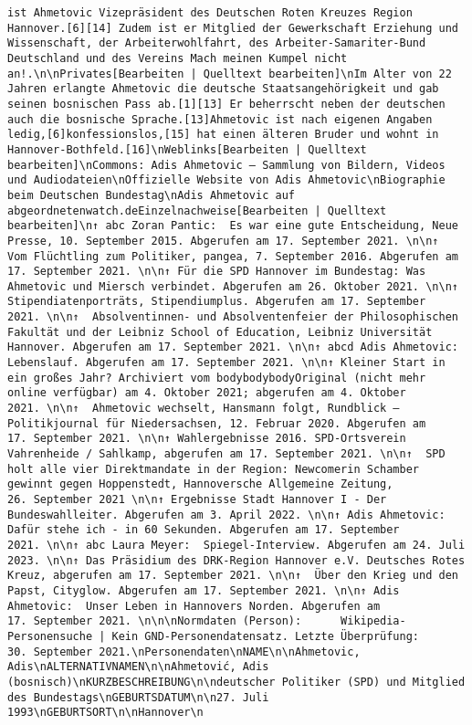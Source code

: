 \documentclass[
]{article}
\begin{document}
\begin{verbatim}
ist Ahmetovic Vizepräsident des Deutschen Roten Kreuzes Region Hannover.[6][14] Zudem ist er Mitglied der Gewerkschaft Erziehung und Wissenschaft, der Arbeiterwohlfahrt, des Arbeiter-Samariter-Bund Deutschland und des Vereins Mach meinen Kumpel nicht an!.\n\nPrivates[Bearbeiten | Quelltext bearbeiten]\nIm Alter von 22 Jahren erlangte Ahmetovic die deutsche Staatsangehörigkeit und gab seinen bosnischen Pass ab.[1][13] Er beherrscht neben der deutschen auch die bosnische Sprache.[13]Ahmetovic ist nach eigenen Angaben ledig,[6]konfessionslos,[15] hat einen älteren Bruder und wohnt in Hannover-Bothfeld.[16]\nWeblinks[Bearbeiten | Quelltext bearbeiten]\nCommons: Adis Ahmetovic – Sammlung von Bildern, Videos und Audiodateien\nOffizielle Website von Adis Ahmetovic\nBiographie beim Deutschen Bundestag\nAdis Ahmetovic auf abgeordnetenwatch.deEinzelnachweise[Bearbeiten | Quelltext bearbeiten]\n↑ abc Zoran Pantic:  Es war eine gute Entscheidung, Neue Presse, 10. September 2015. Abgerufen am 17. September 2021. \n\n↑  Vom Flüchtling zum Politiker, pangea, 7. September 2016. Abgerufen am 17. September 2021. \n\n↑ Für die SPD Hannover im Bundestag: Was Ahmetovic und Miersch verbindet. Abgerufen am 26. Oktober 2021. \n\n↑  Stipendiatenporträts, Stipendiumplus. Abgerufen am 17. September 2021. \n\n↑  Absolventinnen- und Absolventenfeier der Philosophischen Fakultät und der Leibniz School of Education, Leibniz Universität Hannover. Abgerufen am 17. September 2021. \n\n↑ abcd Adis Ahmetovic: Lebenslauf. Abgerufen am 17. September 2021. \n\n↑ Kleiner Start in ein großes Jahr? Archiviert vom bodybodybodyOriginal (nicht mehr online verfügbar) am 4. Oktober 2021; abgerufen am 4. Oktober 2021. \n\n↑  Ahmetovic wechselt, Hansmann folgt, Rundblick – Politikjournal für Niedersachsen, 12. Februar 2020. Abgerufen am 17. September 2021. \n\n↑ Wahlergebnisse 2016. SPD-Ortsverein Vahrenheide / Sahlkamp, abgerufen am 17. September 2021. \n\n↑  SPD holt alle vier Direktmandate in der Region: Newcomerin Schamber gewinnt gegen Hoppenstedt, Hannoversche Allgemeine Zeitung, 26. September 2021 \n\n↑ Ergebnisse Stadt Hannover I - Der Bundeswahlleiter. Abgerufen am 3. April 2022. \n\n↑ Adis Ahmetovic: Dafür stehe ich - in 60 Sekunden. Abgerufen am 17. September 2021. \n\n↑ abc Laura Meyer:  Spiegel-Interview. Abgerufen am 24. Juli 2023. \n\n↑ Das Präsidium des DRK-Region Hannover e.V. Deutsches Rotes Kreuz, abgerufen am 17. September 2021. \n\n↑  Über den Krieg und den Papst, Cityglow. Abgerufen am 17. September 2021. \n\n↑ Adis Ahmetovic:  Unser Leben in Hannovers Norden. Abgerufen am 17. September 2021. \n\n\nNormdaten (Person):      Wikipedia-Personensuche | Kein GND-Personendatensatz. Letzte Überprüfung: 30. September 2021.\nPersonendaten\nNAME\n\nAhmetovic, Adis\nALTERNATIVNAMEN\n\nAhmetović, Adis (bosnisch)\nKURZBESCHREIBUNG\n\ndeutscher Politiker (SPD) und Mitglied des Bundestags\nGEBURTSDATUM\n\n27. Juli 1993\nGEBURTSORT\n\nHannover\n

\end{verbatim}
\end{document}
